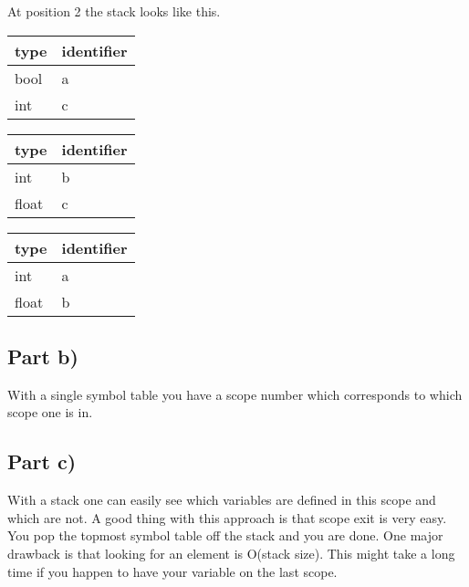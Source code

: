 \documentclass[paper=a4, fontsize=11pt]{scrartcl} %
\numberwithin{equation}{section} %
\numberwithin{figure}{section} %
\numberwithin{table}{section} %
\begin{document}
At position 2 the stack looks like this.
\begin{table}[ht!]
    \begin{center}
    \begin{tabular}{| l | l |}
    \hline
    type  & identifier \\
    \hline
    bool   & a          \\
    \hline
    int & c          \\
    \hline
    \end{tabular}
    \end{center}
\end{table}
\begin{table}[ht!]
    \begin{center}
    \begin{tabular}{| l | l |}
    \hline
    type  & identifier \\
    \hline
    int   & b          \\
    \hline
    float & c          \\
    \hline
    \end{tabular}
    \end{center}
\end{table}
\begin{table}[ht!]
    \begin{center}
    \begin{tabular}{| l | l |}
    \hline
    type  & identifier \\
    \hline
    int   & a          \\
    \hline
    float & b          \\
    \hline
    \end{tabular}
    \end{center}
\end{table}
\subsection{Part b)}
With a single symbol table you have a scope number which corresponds to which scope one is in.
\subsection{Part c)}
With a stack one can easily see which variables are defined in this scope and which are not.
A good thing with this approach is that scope exit is very easy. You pop the topmost symbol table off the stack and you are done.
One major drawback is that looking for an element is O(stack size).
This might take a long time if you happen to have your variable on the last scope.
\end{document}
